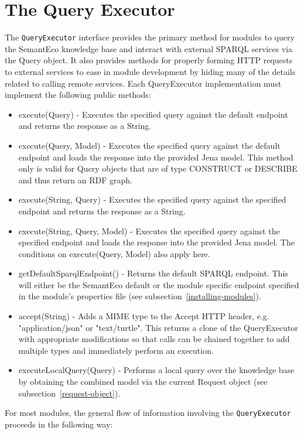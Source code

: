 \documentclass[letterpaper]{report}
\begin{document}
\section{The Query Executor}
\label{query-executor}
The \texttt{QueryExecutor} interface provides the primary method for modules to query the SemantEco knowledge base and interact with external SPARQL services via the Query object. It also provides methods for properly forming HTTP requests to external services to ease in module development by hiding many of the details related to calling remote services. Each QueryExecutor implementation must implement the following public methods:

\begin{itemize}
\item execute(Query) - Executes the specified query against the default endpoint and returns the response as a String.
\item execute(Query, Model) - Executes the specified query against the default endpoint and loads the response into the provided Jena model. This method only is valid for Query objects that are of type CONSTRUCT or DESCRIBE and thus return an RDF graph.
\item execute(String, Query) - Executes the specified query against the specified endpoint and returns the response as a String.
\item execute(String, Query, Model) - Executes the specified query against the specified endpoint and loads the response into the provided Jena model. The conditions on execute(Query, Model) also apply here.
\item getDefaultSparqlEndpoint() - Returns the default SPARQL endpoint. This will either be the SemantEco default or the module specific endpoint specified in the module's properties file (see subsection~\ref{installing-modules}).
\item accept(String) - Adds a MIME type to the Accept HTTP header, e.g. "application/json" or "text/turtle". This returns a clone of the QueryExecutor with appropriate modifications so that calls can be chained together to add multiple types and immediately perform an execution.
\item executeLocalQuery(Query) - Performs a local query over the knowledge base by obtaining the combined model via the current Request object (see subsection~\ref{request-object}).
\end{itemize}

For most modules, the general flow of information involving the \texttt{QueryExecutor} proceeds in the following way:
\end{document}
